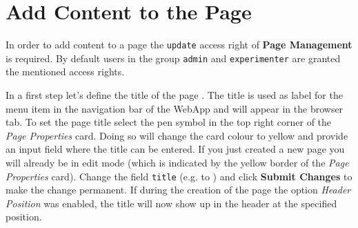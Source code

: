 \documentclass[a4paper,oneside]{book}
\begin{document}
\section{Add Content to the Page}
\label{sec.add_content}
In order to add content to a page the \texttt{update} access right of \textbf{Page Management} is required.
By default users in the group \texttt{admin} and \texttt{experimenter} are granted the mentioned access rights.

In a first step let's define the title of the page .
The title is used as label for the menu item in the navigation bar of the WebApp and will appear in the browser tab.
To set the page title select the pen symbol in the top right corner of the \emph{Page Properties} card.
Doing so will change the card colour to yellow and provide an input field where the title can be entered.
If you just created a new page you will already be in edit mode (which is indicated by the yellow border of the \emph{Page Properties} card).
Change the field \texttt{title} (e.g. to ) and click \textbf{Submit Changes} to make the change permanent.
If during the creation of the page the option \emph{Header Position} was enabled, the title  will now show up in the header at the specified position.
\end{document}
